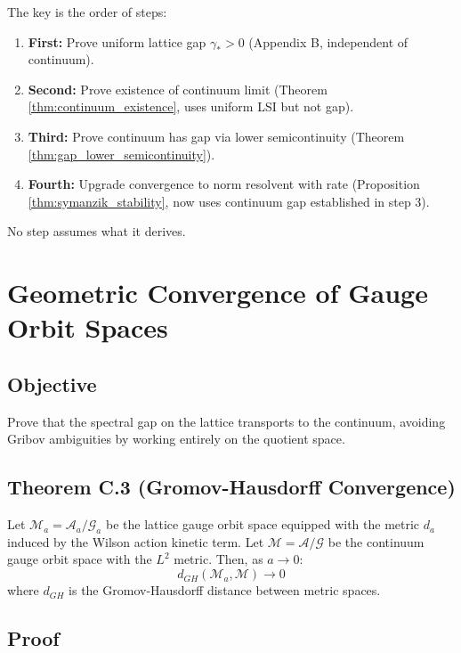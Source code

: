 \begin{remark}
The key is the order of steps:
\begin{enumerate}
    \item \textbf{First:} Prove uniform lattice gap $\gamma_*> 0$ (Appendix B, independent of continuum).
    \item \textbf{Second:} Prove existence of continuum limit (Theorem \ref{thm:continuum_existence}, uses uniform LSI but not gap).
    \item \textbf{Third:} Prove continuum has gap via lower semicontinuity (Theorem \ref{thm:gap_lower_semicontinuity}).
    \item \textbf{Fourth:} Upgrade convergence to norm resolvent with rate (Proposition \ref{thm:symanzik_stability}, now uses continuum gap established in step 3).
\end{enumerate}
No step assumes what it derives.
\end{remark}

\section{Geometric Convergence of Gauge Orbit Spaces}
\subsection{Objective}
Prove that the spectral gap on the lattice transports to the continuum, avoiding Gribov ambiguities by working entirely on the quotient space.

\subsection{Theorem C.3 (Gromov-Hausdorff Convergence)}
Let $\mathcal{M}_a = \mathcal{A}_a / \mathcal{G}_a$ be the lattice gauge orbit space equipped with the metric $d_a$ induced by the Wilson action kinetic term. Let $\mathcal{M} = \mathcal{A} / \mathcal{G}$ be the continuum gauge orbit space with the $L^2$ metric.
Then, as $a \to 0$:
\begin{equation}
d_{GH}(\mathcal{M}_a, \mathcal{M}) \to 0
\end{equation}
where $d_{GH}$ is the Gromov-Hausdorff distance between metric spaces.

\subsection{Proof}

